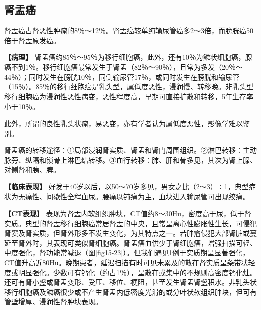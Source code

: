 \subsection{肾盂癌}

肾盂癌占肾恶性肿瘤的8％～12％。肾盂癌较单纯输尿管癌多2～3倍，而膀胱癌50倍于肾盂原发癌。

\textbf{【病理】}
肾盂癌约85％～95％为移行细胞癌，此外，还有10％为鳞状细胞癌，腺癌不到1％。移行细胞癌最常发生于肾盂（82％～90％），且常为多发（20％～44％）；同时发生在膀胱10％，同侧输尿管17％，或同时发生在膀胱和输尿管（15％）。85％的移行细胞癌是乳头型，属低度恶性，浸润慢、转移晚。非乳头型移行细胞癌为浸润性恶性病变，恶性程度高，早期可直接扩散和转移，5年生存率小于10％。

此外，所谓的良性乳头状瘤，易恶变，亦有学者认为属低度恶性，影像学难以鉴别。

肾盂癌的转移途径：①局部浸润肾实质、肾盂和肾门周围组织。②淋巴转移：主动脉旁、纵隔和锁骨上淋巴结转移。③血行转移：肺、肝和骨多见，其次为肾上腺、对侧肾和胰、脾。

\textbf{【临床表现】}
好发于40岁以后，以50～70岁多见，男女之比（2～3）∶1，典型症状为无痛性、间歇性全程血尿。腰痛以钝痛为主，血块进入输尿管可出现绞痛。

\textbf{【CT表现】}
表现为肾盂内软组织肿块，CT值约8～30Hu，密度高于尿，低于肾实质。典型的肾盂移行细胞癌常居肾盂的中央，且常呈离心性膨胀性生长，可侵犯肾窦及肾实质，但肾外形多不发生变化，为其特点之一。若肿瘤侵犯大部肾脏或蔓延至肾外时，其表现可类似肾细胞癌。肾盂癌血供少于肾细胞癌，增强扫描可轻、中度强化，肾功能常减退（图\ref{fig15-23}）。但我们遇见1例于实质期呈显著强化，CT值升高近80Hu。晚期患者，延迟扫描有时可见未累及的散在肾实质呈条带状轻度或明显强化。少数可有钙化（约占1％），呈散在或集中的不规则高密度钙化灶。还可有肾小盏或肾盂变形、受压、移位、梗阻，甚至发生肾盂肾盏积水。非乳头状移行细胞癌及鳞癌很少或不产生肾盂内低密度光滑的或分叶状软组织肿块，但可有管壁增厚、浸润性肾肿块表现。

